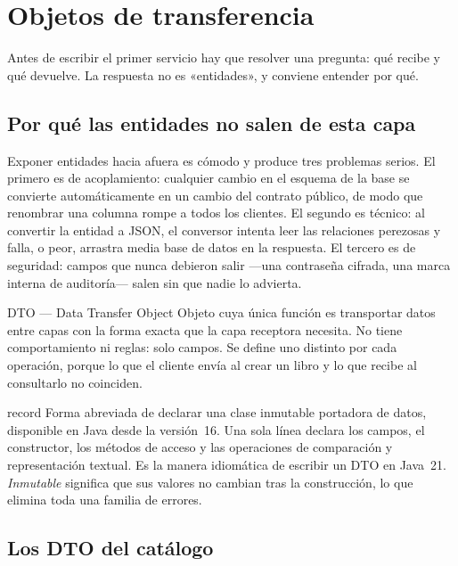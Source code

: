 \documentclass[11pt,a4paper,openany]{book}
\begin{document}
\section{Objetos de transferencia}
\label{sec:dto}

Antes de escribir el primer servicio hay que resolver una pregunta: qué recibe y qué devuelve. La respuesta no es «entidades», y conviene entender por qué.

\subsection{Por qué las entidades no salen de esta capa}
\label{sec:por-que-dto}

Exponer entidades hacia afuera es cómodo y produce tres problemas serios. El primero es de acoplamiento: cualquier cambio en el esquema de la base se convierte automáticamente en un cambio del contrato público, de modo que renombrar una columna rompe a todos los clientes. El segundo es técnico: al convertir la entidad a JSON, el conversor intenta leer las relaciones perezosas y falla, o peor, arrastra media base de datos en la respuesta. El tercero es de seguridad: campos que nunca debieron salir ---una contraseña cifrada, una marca interna de auditoría--- salen sin que nadie lo advierta.

\begin{cajadefinicion}{DTO --- Data Transfer Object}
	Objeto cuya única función es transportar datos entre capas con la forma exacta que la capa receptora necesita. No tiene comportamiento ni reglas: solo campos. Se define uno distinto por cada operación, porque lo que el cliente envía al crear un libro y lo que recibe al consultarlo no coinciden.
\end{cajadefinicion}

\begin{cajadefinicion}{record}
	Forma abreviada de declarar una clase inmutable portadora de datos, disponible en Java desde la versión~16. Una sola línea declara los campos, el constructor, los métodos de acceso y las operaciones de comparación y representación textual. Es la manera idiomática de escribir un DTO en Java~21. \emph{Inmutable} significa que sus valores no cambian tras la construcción, lo que elimina toda una familia de errores.
\end{cajadefinicion}

\subsection{Los DTO del catálogo}
\label{sec:dto-catalogo}
\end{document}
